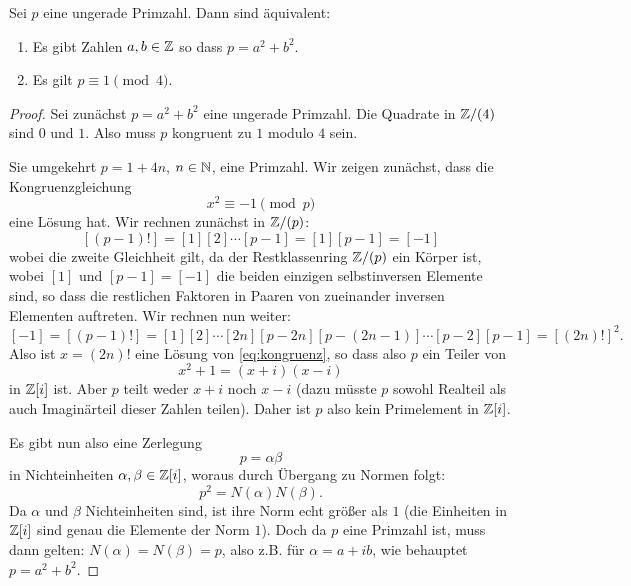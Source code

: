 \documentclass{book}
\begin{document}
\begin{lem}
    \label{lem:Gausslem} Sei $p$ eine ungerade Primzahl. Dann sind äquivalent:
    \begin{enumerate}[label=(\roman *)]
        \item Es gibt Zahlen $a,b \in \mathbb{Z}$ so dass $p = a^2 + b^2$.
        \item Es gilt $p \equiv 1 \pmod{4}$. 
    \end{enumerate}
\end{lem}
\begin{proof}
    Sei zunächst $p = a^2 + b^2$ eine ungerade Primzahl. Die Quadrate in
    $\mathbb{Z}/(4)$ sind $0$ und $1$. Also muss $p$ kongruent zu $1$ modulo $4$
    sein.

    Sie umgekehrt $p = 1 + 4n$, $n \in \mathbb{N}$, eine Primzahl. Wir zeigen
    zunächst, dass die Kongruenzgleichung
    \begin{equation}\label{eq:kongruenz}
       x^2 \equiv -1 \pmod{p}
    \end{equation}
    eine Lösung hat. Wir rechnen zunächst in $\mathbb{Z}/(p)$:
    \[
        [(p-1)!] = [1] [2] \cdots [p-1] = [1][p-1] = [-1]
    \]
    wobei die zweite Gleichheit gilt, da der Restklassenring $\mathbb{Z}/(p)$ ein
    Körper ist, wobei $[1]$ und $[p-1] = [-1]$ die beiden einzigen
    selbstinversen Elemente sind, so dass die restlichen Faktoren in Paaren von
    zueinander inversen Elementen auftreten. Wir rechnen nun weiter:
    \[
        [-1] = [(p-1)!] = [1][2] \cdots [2n][p-2n][p-(2n-1)] \cdots [p-2][p-1] = [(2n)!]^2.
    \]
    Also ist $x = (2n)!$ eine Lösung von \eqref{eq:kongruenz}, so dass also $p$ ein Teiler von 
    \[
        x^2 + 1 = (x+i)(x-i)
    \]
    in $\mathbb{Z}[i]$ ist. Aber $p$ teilt weder $x+i$ noch $x-i$ (dazu müsste $p$
    sowohl Realteil als auch Imaginärteil dieser Zahlen teilen). Daher ist $p$
    also kein Primelement in $\mathbb{Z}[i]$. 

    Es gibt nun also eine Zerlegung 
    \[
        p = \alpha \beta
    \] 
    in Nichteinheiten $\alpha,\beta \in \mathbb{Z}[i]$, woraus durch Übergang zu Normen folgt:
    \[
        p^2 = N(\alpha)N(\beta).
    \]
    Da $\alpha$ und $\beta$ Nichteinheiten sind, ist ihre Norm echt größer als
    $1$ (die Einheiten in $\mathbb{Z}[i]$ sind genau die Elemente der Norm $1$). Doch
    da $p$ eine Primzahl ist, muss dann gelten: $N(\alpha) = N(\beta) = p$,
    also z.B. für $\alpha = a + i b$, wie behauptet $p = a^2 + b^2$. 
\end{proof}
\end{document}
